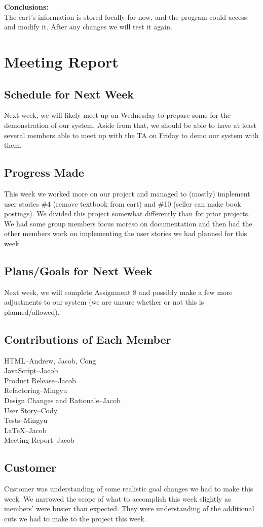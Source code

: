 \documentclass[12pt]{article}
\begin{document}
	\textbf{Conclusions:} \\
	The cart’s information is stored locally for now, and the program could access and modify it. After any changes we will test it again.



	\section{Meeting Report}

		\subsection{Schedule for Next Week}
		Next week, we will likely meet up on Wednesday to prepare some for the demonstration
		of our system. Aside from that, we should be able to have at least several members
		able to meet up with the TA on Friday to demo our system with them.
		

		\subsection{Progress Made}
		This week we worked more on our project and managed to (mostly) implement user
		stories \#4 (remove textbook from cart) and \#10 (seller can make book postings).
		We divided this project somewhat differently than for prior projects. We had some
		group members focus moreso on documentation and then had the other members work on
		implementing the user stories we had planned for this week.

		\subsection{Plans/Goals for Next Week}
		Next week, we will complete Assignment 8 and possibly make a few more adjustments to our system (we are unsure whether or not this is planned/allowed).

		\subsection{Contributions of Each Member}
			HTML--Andrew, Jacob, Cong \\
			JavaScript--Jacob \\
			Product Release--Jacob \\
			Refactoring--Mingyu           \\
			Design Changes and Rationale--Jacob \\
			User Story--Cody\\
			Tests--Mingyu \\
			LaTeX--Jacob \\
			Meeting Report--Jacob \\


		\subsection{Customer}
		Customer was understanding of some realistic goal changes we had to make this week. We narrowed the scope of what to accomplish this week slightly as members’ were busier than expected. They were understanding of the additional cuts we had to make
		to the project this week.

	
\end{document}
